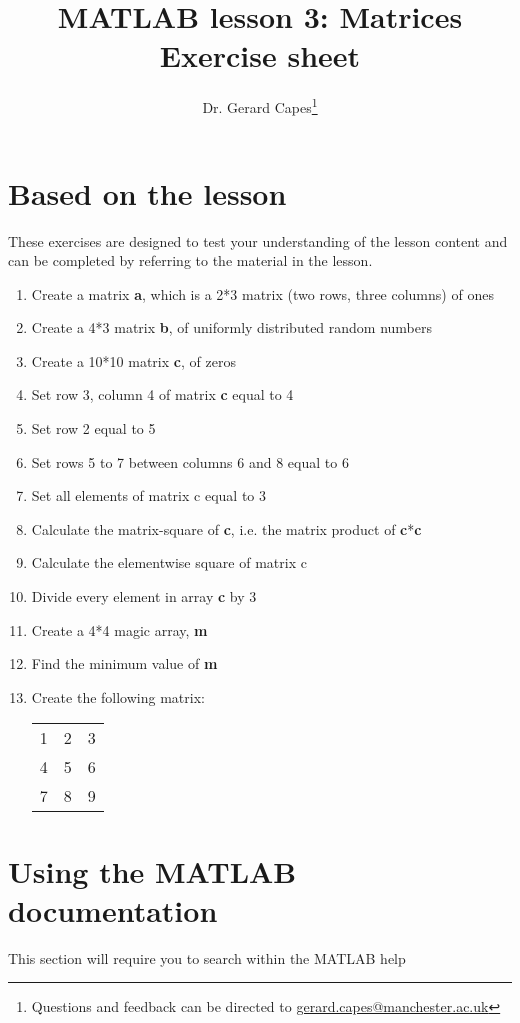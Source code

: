 \documentclass[a4paper]{article}
\title{MATLAB lesson 3: Matrices\\Exercise sheet}
\date{}
\author{Dr. Gerard Capes\thanks{Questions and feedback can be directed to \href{mailto:gerard.capes@manchester.ac.uk?subject=Feedback on MATLAB lesson 3 (matrices) exercise sheet}{gerard.capes@manchester.ac.uk}}}
\begin{document}
\maketitle

\section{Based on the lesson}
{\large These exercises are designed to test your understanding of the lesson content and can be completed by referring to the material in the lesson.}
\begin{enumerate}
	\item Create a matrix \textbf{a}, which is a 2*3 matrix (two rows, three columns) of ones
	\item Create a 4*3 matrix \textbf{b}, of uniformly distributed random numbers
	\item Create a 10*10 matrix \textbf{c}, of zeros
	\item Set row 3, column 4 of matrix \textbf{c} equal to 4
	\item Set row 2 equal to 5
	\item Set rows 5 to 7 between columns 6 and 8 equal to 6
	\item Set all elements of matrix c equal to 3
	\item Calculate the matrix-square of \textbf{c}, i.e. the matrix product of \textbf{c}*\textbf{c}
	\item Calculate the elementwise square of matrix c
	\item Divide every element in array \textbf{c} by 3
	\item Create a 4*4 magic array, \textbf{m}
	\item Find the minimum value of \textbf{m}
	\item Create the following matrix:
		\begin{table}[h!]
			\centering
			\begin{tabular}{ccc}
				1 & 2 & 3\\
				4 & 5 & 6\\
				7 & 8 & 9\\
			\end{tabular}
		\end{table}	
\end{enumerate}

\pagebreak

\section{Using the MATLAB documentation}
{\large This section will require you to search within the MATLAB help}
\end{document}
